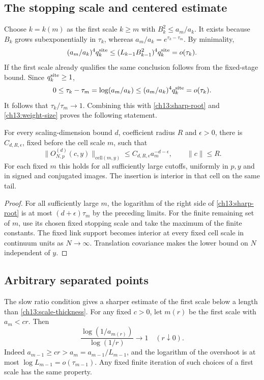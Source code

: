 \subsection{The stopping scale and centered estimate}

Choose $k=k(m)$ as the first scale $k\ge m$ with
$B_k^2\le a_m/a_k$. It exists because $B_k$ grows subexponentially
in $\tau_k$, whereas $a_m/a_k=e^{\tau_k-\tau_m}$. By minimality,
\[
 (a_m/a_k)^4q_k^{\rm site}
       \le (L_{k-1}B_{k-1}^2)^4q_k^{\rm site}=o(\tau_k).
\]
If the first scale already qualifies the same conclusion follows from
the fixed-stage bound. Since $q_k^{\rm site}\ge1$,
\[
 0\le\tau_k-\tau_m=\log(a_m/a_k)
       \le(a_m/a_k)^4q_k^{\rm site}=o(\tau_k).
\]
It follows that $\tau_k/\tau_m\to1$.
Combining this with \eqref{ch13:sharp-root} and
\eqref{ch13:weight-size} proves the following statement.

\begin{proposition}
\label{ch13:sharp-centered}
For every scaling-dimension bound $d$, coefficient radius $R$ and $\epsilon>0$, there
is $C_{d,R,\epsilon}$, fixed before the cell scale $m$, such that
\[
 \|O_{N,p}^{(d)}(c,y)\|_{\mathrm{cell}(m,y)}
        \le C_{d,R,\epsilon}a_m^{-d-\epsilon},\qquad\|c\|\le R.
\]
For each fixed $m$ this holds for all sufficiently large cutoffs,
uniformly in $p,y$ and in signed and conjugated images. The insertion
is interior in that cell on the same tail.
\end{proposition}
\begin{proof}
For all sufficiently large $m$, the logarithm of the right side of
\eqref{ch13:sharp-root} is at most $(d+\epsilon)\tau_m$ by the
preceding limits. For the finite remaining set of $m$, use its chosen
fixed stopping scale and take the maximum of the finite constants.
The fixed link support becomes interior at every fixed cell
scale in continuum units as $N\to\infty$. Translation covariance makes the lower bound on $N$
independent of $y$.
\end{proof}

\subsection{Arbitrary separated points}

The slow ratio condition gives a sharper estimate of the first scale below a length
than \eqref{ch13:scale-thickness}. For any fixed $c>0$, let $m(r)$
be the first scale with $a_m<cr$. Then
\begin{equation}
            \frac{\log(1/a_{m(r)})}{\log(1/r)}\longrightarrow1
                         \quad(r\downarrow0).
 \label{ch13:first-below}
\end{equation}
Indeed $a_{m-1}\ge cr>a_m=a_{m-1}/L_{m-1}$, and the logarithm of
the overshoot is at most $\log L_{m-1}=o(\tau_{m-1})$.
Any fixed finite iteration of such choices of a first scale has the same property.


